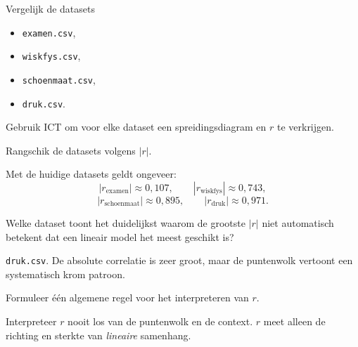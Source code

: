 \documentclass{ximera}
\begin{document}
\begin{oefening}{\oefU \ESS}

Vergelijk de datasets

\begin{itemize}
  \item \texttt{examen.csv},
  \item \texttt{wiskfys.csv},
  \item \texttt{schoenmaat.csv},
  \item \texttt{druk.csv}.
\end{itemize}

Gebruik ICT om voor elke dataset een spreidingsdiagram en $r$ te verkrijgen.

\begin{question}
Rangschik de datasets volgens $|r|$.

\begin{oplossing}
Met de huidige datasets geldt ongeveer:
\[
|r_{\text{examen}}|\approx0{,}107,\qquad
|r_{\text{wiskfys}}|\approx0{,}743,
\]
\[
|r_{\text{schoenmaat}}|\approx0{,}895,\qquad
|r_{\text{druk}}|\approx0{,}971.
\]
\end{oplossing}
\end{question}

\begin{question}
Welke dataset toont het duidelijkst waarom de grootste $|r|$ niet
automatisch betekent dat een lineair model het meest geschikt is?

\begin{oplossing}
\texttt{druk.csv}. De absolute correlatie is zeer groot, maar de
puntenwolk vertoont een systematisch krom patroon.
\end{oplossing}
\end{question}

\begin{question}
Formuleer één algemene regel voor het interpreteren van $r$.

\begin{oplossing}
Interpreteer $r$ nooit los van de puntenwolk en de context. $r$ meet
alleen de richting en sterkte van \emph{lineaire} samenhang.
\end{oplossing}
\end{question}

\end{oefening}
\end{document}

